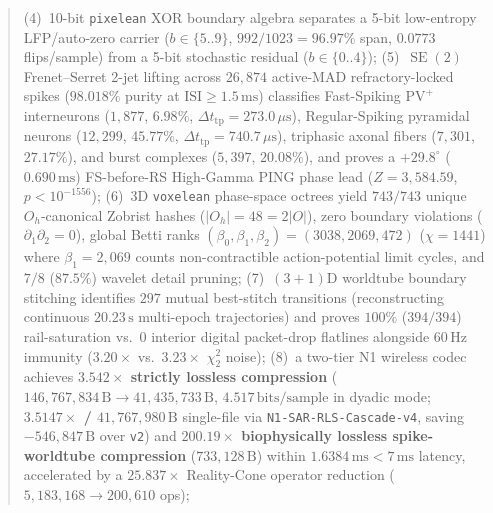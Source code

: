 \documentclass[11pt,letterpaper]{article}
\theoremstyle{definition}
\begin{document}
\begin{abstract}
(4)~10-bit \texttt{pixelean} XOR boundary algebra separates a 5-bit low-entropy LFP/auto-zero carrier ($b \in \{5..9\}$, $992/1023 = 96.97\%$ span, $0.0773$ flips/sample) from a 5-bit stochastic residual ($b \in \{0..4\}$);
(5)~$\operatorname{SE}(2)$ Frenet--Serret 2-jet lifting across $26{,}874$ active-MAD refractory-locked spikes ($98.018\%$ purity at $\mathrm{ISI} \ge 1.5\,\text{ms}$) classifies Fast-Spiking $\text{PV}^+$ interneurons ($1{,}877$, $6.98\%$, $\Delta t_{\mathrm{tp}} = 273.0\,\mu\text{s}$), Regular-Spiking pyramidal neurons ($12{,}299$, $45.77\%$, $\Delta t_{\mathrm{tp}} = 740.7\,\mu\text{s}$), triphasic axonal fibers ($7{,}301$, $27.17\%$), and burst complexes ($5{,}397$, $20.08\%$), and proves a $+29.8^\circ$ ($0.690\,\text{ms}$) FS-before-RS High-Gamma PING phase lead ($Z = 3{,}584.59$, $p < 10^{-1556}$);
(6)~$3\text{D}$ \texttt{voxelean} phase-space octrees yield $743 / 743$ unique $O_h$-canonical Zobrist hashes ($|O_h| = 48 = 2|O|$), zero boundary violations ($\partial_1\partial_2 = 0$), global Betti ranks $(\beta_0, \beta_1, \beta_2) = (3038, 2069, 472)$ ($\chi = 1441$) where $\beta_1 = 2{,}069$ counts non-contractible action-potential limit cycles, and $7/8$ ($87.5\%$) wavelet detail pruning;
(7)~$(3+1)\text{D}$ worldtube boundary stitching identifies $297$ mutual best-stitch transitions (reconstructing continuous $20.23\,\text{s}$ multi-epoch trajectories) and proves $100\%$ ($394/394$) rail-saturation vs.\ $0$ interior digital packet-drop flatlines alongside $60\,\text{Hz}$ immunity ($3.20\times$ vs.\ $3.23\times$ $\chi^2_2$ noise);
(8)~a two-tier N1 wireless codec achieves \textbf{$3.542\times$ strictly lossless compression} ($146{,}767{,}834\,\text{B} \to 41{,}435{,}733\,\text{B}$, $4.517\,\text{bits/sample}$ in dyadic mode; \textbf{$3.5147\times$ / $41{,}767{,}980\,\text{B}$} single-file via \nolinkurl{N1-SAR-RLS-Cascade-v4}, saving $-546{,}847\,\text{B}$ over \texttt{v2}) and \textbf{$200.19\times$ biophysically lossless spike-worldtube compression} ($733{,}128\,\text{B}$) within $1.6384\,\text{ms} < 7\,\text{ms}$ latency, accelerated by a $25.837\times$ Reality-Cone operator reduction ($5{,}183{,}168 \to 200{,}610$ ops);

\end{abstract}
\end{document}

